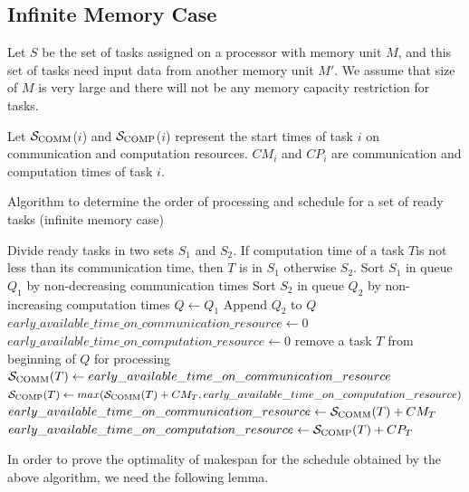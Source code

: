 \documentclass[runningheads]{llncs} %
\newcommand{\scomm}{\ensuremath{{\cal S}_{\text{COMM}}}}
\newcommand{\scomp}{\ensuremath{{\cal S}_{\text{COMP}}}}
\begin{document}
	
	\subsection{Infinite Memory Case}
	Let $S$ be the set of tasks assigned on a processor with memory unit $M$, and this set of tasks  need input data from another memory unit $M'$. We assume that size of $M$ is very large and there will not be any memory capacity restriction for tasks.
	
	Let \scomm($i$) and  \scomp($i$) represent the start times of task $i$ on communication and computation resources. $CM_i$ and $CP_i$ are communication and computation times of task $i$.
	
	\begin{algorithm}
	\caption{\label{alg:OrderOfExecutionInfinteMemory}Algorithm to determine the order of processing and schedule for a set of ready tasks (infinite memory case)}
	\begin{algorithmic}[1]
		\STATE Divide ready tasks in two sets $S_1$ and $S_2$. If computation time of a task $T$is not less than its communication time, then $T$ is in $S_1$ otherwise $S_2$.
		\STATE Sort $S_1$ in queue $Q_1$ by non-decreasing communication times
		\STATE Sort $S_2$ in queue $Q_2$ by non-increasing computation times
		\STATE $Q \gets  Q_1$
		\STATE Append $Q_2$ to $Q$
		\STATE $early\_available\_time\_on\_communication\_resource \gets 0$
		\STATE $early\_available\_time\_on\_computation\_resource \gets 0$
		\STATE remove a task $T$ from beginning of $Q$ for processing
		\STATE $\scomm(T) \gets  early\_available\_time\_on\_communication\_resource$
		\STATE $\scomp(T) \gets  max(\scomm(T) + CM_T, early\_available\_time\_on\_computation\_resource)$
		\STATE $early\_available\_time\_on\_communication\_resource \gets  \scomm(T) + CM_T$
		\STATE $early\_available\_time\_on\_computation\_resource \gets  \scomp(T) + CP_T$
		\ENDWHILE
	\end{algorithmic}
\end{algorithm}
	
	
In order to prove the optimality of makespan for the schedule obtained by the above algorithm, we need the following lemma.
\end{document}
